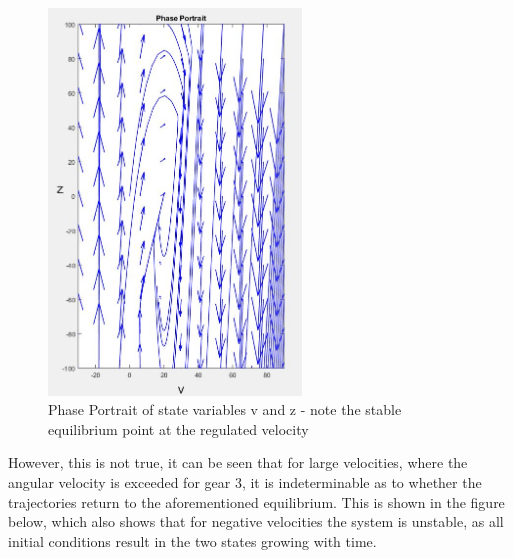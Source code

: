 \documentclass[12pt]{article}
\begin{document}
\begin{center}
\begin{figure}[htb]
	\includegraphics[width=0.6\textwidth]{A2_phaseportrait_2.jpg}
\caption{Phase Portrait of state variables v and z - note the stable equilibrium point at the regulated velocity}
\end{figure}
\end{center}

\clearpage

However, this is not true, it can be seen that for large velocities, where the angular velocity is exceeded for gear 3, it is indeterminable as to whether the trajectories return to the aforementioned equilibrium. This is shown in the figure below, which also shows that for negative velocities the system is unstable, as all initial conditions result in the two states growing with time.




\clearpage
\end{document}
